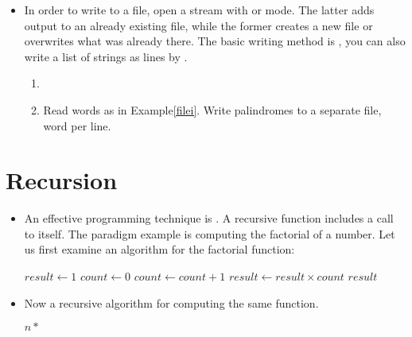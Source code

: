 \documentclass[a4paper]{article}
\begin{document}
{\begin{itemize}
\begin{uexample}
\end{uexample}

\item In order to write to a file, open a stream with 
 or  mode. The latter adds output to an already existing file,
while the former creates a new file or overwrites what was already there. The
basic writing method is , you can also write a list of strings as
lines by .

\begin{uexercise}
\begin{enumerate}
\item[]
\item Read words as in Example\ref{filei}. Write palindromes to a separate file,
word per line.
\end{enumerate}
\end{uexercise}


\end{itemize}


\section{Recursion}

\begin{itemize}

\item An effective programming technique is . A recursive
function includes a call to itself. The paradigm example is computing the
factorial of a number. Let us first examine an  algorithm for
the factorial function:

\begin{ucodeframe}
\vspace{1em}
\begin{algorithmic}
\State $result \gets 1$
\State $count \gets 0$
		\State $count \gets count + 1$
		\State $result \gets result \times count$
	\EndWhile
\State \Return $result$
\EndFunction
\end{algorithmic}
\end{ucodeframe}

\item Now a recursive algorithm for computing the same function.

\begin{ucodeframe}
\vspace{1em}
\begin{algorithmic}
\State {}
\Else
\State \Return $n*$ 
\EndIf
\EndFunction
\end{algorithmic}


\end{ucodeframe}
\end{itemize}}
\end{document}
